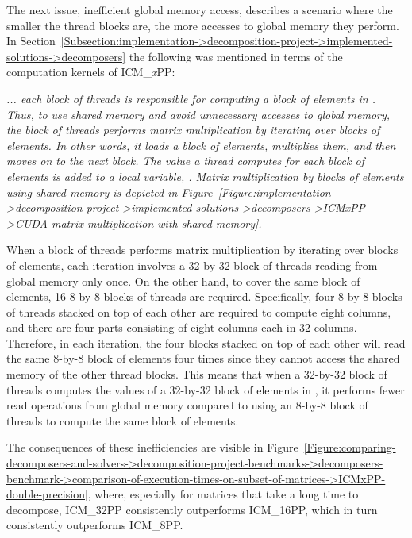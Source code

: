 The next issue, inefficient global memory access, describes a scenario where the smaller the thread blocks are, the more accesses to global memory they perform. In Section~\ref{Subsection:implementation->decomposition-project->implemented-solutions->decomposers} the following was mentioned in terms of the computation kernels of ICM\_\textit{x}PP:

\begin{quoting}
	\textit{... each block of threads is responsible for computing a block of elements in . Thus, to use shared memory and avoid unnecessary accesses to global memory, the block of threads performs matrix multiplication by iterating over blocks of elements. In other words, it loads a block of elements, multiplies them, and then moves on to the next block. The value a thread computes for each block of elements is added to a local variable, . Matrix multiplication by blocks of elements using shared memory is depicted in Figure~\ref{Figure:implementation->decomposition-project->implemented-solutions->decomposers->ICMxPP->CUDA-matrix-multiplication-with-shared-memory}.}
\end{quoting}

When a block of threads performs matrix multiplication by iterating over blocks of elements, each iteration involves a 32-by-32 block of threads reading from global memory only once. On the other hand, to cover the same block of elements, 16 8-by-8 blocks of threads are required. Specifically, four 8-by-8 blocks of threads stacked on top of each other are required to compute eight columns, and there are four parts consisting of eight columns each in 32 columns. Therefore, in each iteration, the four blocks stacked on top of each other will read the same 8-by-8 block of elements four times since they cannot access the shared memory of the other thread blocks.
This means that when a 32-by-32 block of threads computes the values of a 32-by-32 block of elements in , it performs fewer read operations from global memory compared to using an 8-by-8 block of threads to compute the same block of elements.

The consequences of these inefficiencies are visible in Figure~\ref{Figure:comparing-decomposers-and-solvers->decomposition-project-benchmarks->decomposers-benchmark->comparison-of-execution-times-on-subset-of-matrices->ICMxPP-double-precision}, where, especially for matrices that take a long time to decompose, ICM\_32PP consistently outperforms ICM\_16PP, which in turn consistently outperforms ICM\_8PP.\label{Text:comparing-decomposers-and-solvers->decomposition-project-benchmarks->decomposers-benchmark->comparison-of-execution-times-on-subset-of-matrices->ICMxPP->performance-of-variants}

